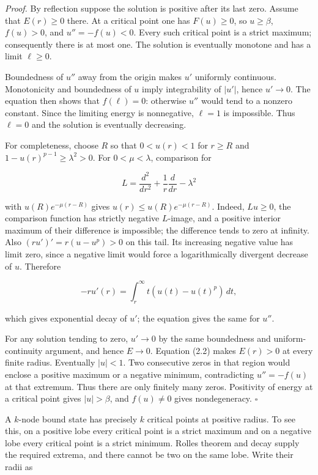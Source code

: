 \documentclass[11pt]{article}
\begin{document}
\emph{Proof.} By reflection suppose the solution is positive after its
last zero. Assume that \(E(r)\geq0\) there. At a critical point one has
\(F(u)\geq0\), so \(u\geq\beta\), \(f(u)>0\), and \(u''=-f(u)<0\). Every
such critical point is a strict maximum; consequently there is at most
one. The solution is eventually monotone and has a limit \(\ell\geq0\).

Boundedness of \(u''\) away from the origin makes \(u'\) uniformly
continuous. Monotonicity and boundedness of \(u\) imply integrability of
\(|u'|\), hence \(u'\to0\). The equation then shows that \(f(\ell)=0\):
otherwise \(u''\) would tend to a nonzero constant. Since the limiting
energy is nonnegative, \(\ell=1\) is impossible. Thus \(\ell=0\) and the
solution is eventually decreasing.

For completeness, choose \(R\) so that \(0<u(r)<1\) for \(r\geq R\) and
\(1-u(r)^{p-1}\geq\lambda^2>0\). For \(0<\mu<\lambda\), comparison for

\[L=\frac{d^2}{dr^2}+\frac1r\frac d{dr}-\lambda^2\]

with \(u(R)e^{-\mu(r-R)}\) gives \(u(r)\leq u(R)e^{-\mu(r-R)}\). Indeed,
\(Lu\geq0\), the comparison function has strictly negative \(L\)-image,
and a positive interior maximum of their difference is impossible; the
difference tends to zero at infinity. Also \((ru')'=r(u-u^p)>0\) on this
tail. Its increasing negative value has limit zero, since a negative
limit would force a logarithmically divergent decrease of \(u\).
Therefore

\[-ru'(r)=\int_r^\infty t(u(t)-u(t)^p)\,dt,\]

which gives exponential decay of \(u'\); the equation gives the same for
\(u''\).

For any solution tending to zero, \(u'\to0\) by the same boundedness and
uniform-continuity argument, and hence \(E\to0\). Equation (2.2) makes
\(E(r)>0\) at every finite radius. Eventually \(|u|<1\). Two consecutive
zeros in that region would enclose a positive maximum or a negative
minimum, contradicting \(u''=-f(u)\) at that extremum. Thus there are
only finitely many zeros. Positivity of energy at a critical point gives
\(|u|>\beta\), and \(f(u)\ne0\) gives nondegeneracy. \(\square\)

A \(k\)-node bound state has precisely \(k\) critical points at positive
radius. To see this, on a positive lobe every critical point is a strict
maximum and on a negative lobe every critical point is a strict minimum.
Rolle\textquotesingle s theorem and decay supply the required extrema,
and there cannot be two on the same lobe. Write their radii as
\end{document}
